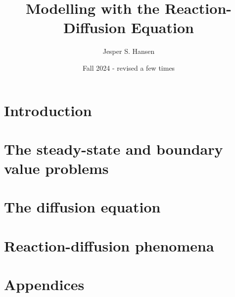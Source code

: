 \documentclass[10pt, b5paper]{book}
\title{Modelling with the Reaction-Diffusion Equation}
\author{Jesper S. Hansen}
\date{Fall 2024 - revised a few times}
\begin{document}
\maketitle



\clearpage

\tableofcontents


\chapter{Introduction}



\chapter{The steady-state and boundary value problems\label{sect:BV}}



\chapter{The diffusion equation}



\chapter{Reaction-diffusion phenomena\label{ch:rd}}




\chapter{Appendices}






\printindex
\end{document}
